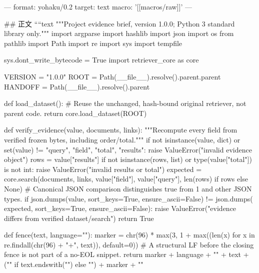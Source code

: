 ---
format: yohaku/0.2
target: text
macro: '[[macros/raw]]'
---

## 正文
````text
"""Project evidence brief, version 1.0.0; Python 3 standard library only."""
import argparse
import hashlib
import json
import os
from pathlib import Path
import re
import sys
import tempfile

sys.dont_write_bytecode = True
import retriever_core as core

VERSION = "1.0.0"
ROOT = Path(__file__).resolve().parent.parent
HANDOFF = Path(__file__).resolve().parent


def load_dataset():
    # Reuse the unchanged, hash-bound original retriever, not parent code.
    return core.load_dataset(ROOT)


def verify_evidence(value, documents, links):
    """Recompute every field from verified frozen bytes, including order/total."""
    if not isinstance(value, dict) or set(value) != {"query", "field", "total", "results"}:
        raise ValueError("invalid evidence object")
    rows = value["results"]
    if not isinstance(rows, list) or type(value["total"]) is not int:
        raise ValueError("invalid results or total")
    expected = core.search(documents, links, value["field"], value["query"],
                           len(rows) if rows else None)
    # Canonical JSON comparison distinguishes true from 1 and other JSON types.
    if json.dumps(value, sort_keys=True, ensure_ascii=False) != json.dumps(
            expected, sort_keys=True, ensure_ascii=False):
        raise ValueError("evidence differs from verified dataset/search")
    return True


def fence(text, language=""):
    marker = chr(96) * max(3, 1 + max((len(x) for x in re.findall(chr(96) + "+", text)), default=0))
    # A structural LF before the closing fence is not part of a no-EOL snippet.
    return marker + language + "\n" + text + ("" if text.endswith("\n") else "\n") + marker + "\n"


